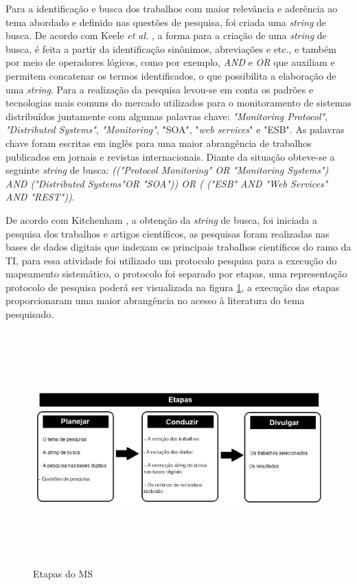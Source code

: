 Para a identificação e busca dos trabalhos com maior relevância e aderência ao tema abordado e definido nas questões de pesquisa, foi criada uma \textit{string} de busca. De acordo com Keele \textit{et al.} \cite{keele2007guidelines}, a forma para a criação de uma \textit{string} de busca, é feita a partir da identificação sinônimos, abreviações e etc., e também por meio de operadores lógicos, como por exemplo, \textit{AND} e \textit{OR} que auxiliam e permitem concatenar os termos identificados, o que possibilita a elaboração de uma \textit{string}. Para a realização da pesquisa levou-se em conta os padrões e tecnologias mais comuns do mercado utilizados para o monitoramento de sistemas distribuídos juntamente com algumas palavras chave: \textit{"Monitoring Protocol"}, \textit{"Distributed Systems"}, \textit{"Monitoring"}, "\acrshort{SOA}", "\textit{web services}" e "\acrshort{ESB}". As palavras chave foram escritas em inglês para uma maior abrangência de trabalhos publicados em jornais e revistas internacionais. Diante da situação obteve-se a seguinte \textit{string} de busca: \textit{(("Protocol Monitoring" OR "Monitoring Systems") AND ("Distributed Systems"OR "SOA")) OR ( ("ESB" AND "Web Services" AND "REST"))}.

De acordo com Kitchenham \cite{kitchenham2007guidelines}, a obtenção da \textit{string} de busca, foi iniciada a pesquisa dos trabalhos e artigos científicos, as pesquisas foram realizadas nas bases de dados digitais que indexam os principais trabalhos científicos do ramo da \acrlong{TI}, para essa atividade foi utilizado um protocolo pesquisa para a execução do mapeamento sistemático, o protocolo foi separado por etapas, uma representação protocolo de pesquisa poderá ser visualizada na figura \ref{fig:etapasRSL}, a execução das etapas proporcionaram uma maior abrangência no acesso à literatura do tema pesquisado.

\begin{figure}[!ht]
\centering
\includegraphics[width = 16cm, height=9cm]{img/etapas_RSL_final.jpg}
\caption{Etapas do \acrlong{MS}}
\label{fig:etapasRSL}
\end{figure}

